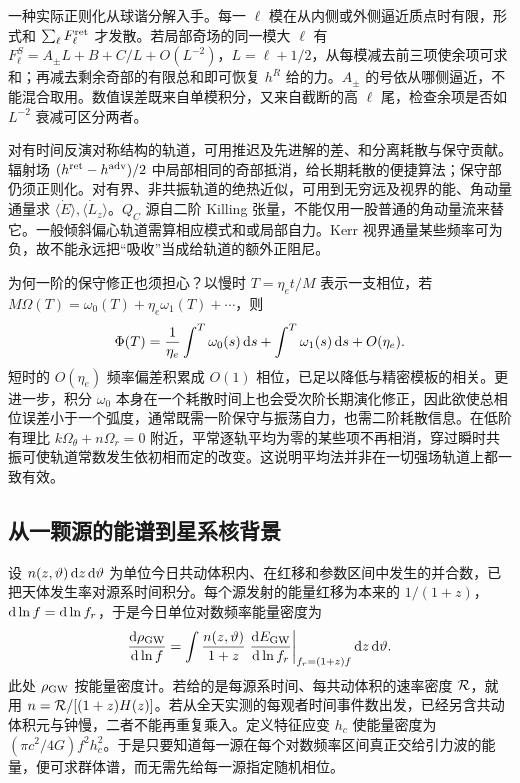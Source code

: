 一种实际正则化从球谐分解入手。每一 $\ell$ 模在从内侧或外侧逼近质点时有限，形式和 $\sum_\ell F_\ell^{\rm ret}$ 才发散。若局部奇场的同一模大 $\ell$ 有 $F_\ell^S=A_\pm L+B+C/L+O(L^{-2})$，$L=\ell+1/2$，从每模减去前三项使余项可求和；再减去剩余奇部的有限总和即可恢复 $h^R$ 给的力。$A_\pm$ 的号依从哪侧逼近，不能混合取用。数值误差既来自单模积分，又来自截断的高 $\ell$ 尾，检查余项是否如 $L^{-2}$ 衰减可区分两者。

对有时间反演对称结构的轨道，可用推迟及先进解的差、和分离耗散与保守贡献。辐射场 $(h^{\rm ret}-h^{\rm adv})/2$ 中局部相同的奇部抵消，给长期耗散的便捷算法；保守部仍须正则化。对有界、非共振轨道的绝热近似，可用到无穷远及视界的能、角动量通量求 $\langle\dot E\rangle,\langle\dot L_z\rangle$。$Q_C$ 源自二阶 Killing 张量，不能仅用一股普通的角动量流来替它。一般倾斜偏心轨道需算相应模式和或局部自力。Kerr 视界通量某些频率可为负，故不能永远把“吸收”当成给轨道的额外正阻尼。

为何一阶的保守修正也须担心？以慢时 $T=\eta_e t/M$ 表示一支相位，若 $M\Omega(T)=\omega_0(T)+\eta_e\omega_1(T)+\cdots$，则
\[
 \Phi(T)=\frac1{\eta_e}\int^T\omega_0(s)\,\dd s+
                         \int^T\omega_1(s)\,\dd s+O(\eta_e).
\]
短时的 $O(\eta_e)$ 频率偏差积累成 $O(1)$ 相位，已足以降低与精密模板的相关。更进一步，积分 $\omega_0$ 本身在一个耗散时间上也会受次阶长期演化修正，因此欲使总相位误差小于一个弧度，通常既需一阶保守与振荡自力，也需二阶耗散信息。在低阶有理比 $k\Omega_\theta+n\Omega_r=0$ 附近，平常逐轨平均为零的某些项不再相消，穿过瞬时共振可使轨道常数发生依初相而定的改变。这说明平均法并非在一切强场轨道上都一致有效。

\subsection{从一颗源的能谱到星系核背景}

设 $n(z,\vartheta)\,\dd z\,\dd\vartheta$ 为单位今日共动体积内、在红移和参数区间中发生的并合数，已把天体发生率对源系时间积分。每个源发射的能量红移为本来的 $1/(1+z)$，$\dd\ln f=\dd\ln f_r$，于是今日单位对数频率能量密度为
\begin{equation}
 \frac{\dd\rho_{\rm GW}}{\dd\ln f}
 =\int\frac{n(z,\vartheta)}{1+z}
     \left.\frac{\dd E_{\rm GW}}{\dd\ln f_r}\right|_{f_r=(1+z)f}
        \dd z\,\dd\vartheta .
 \label{eq:gw-cpopulation}
\end{equation}
此处 $\rho_{\rm GW}$ 按能量密度计。若给的是每源系时间、每共动体积的速率密度 ${\cal R}$，就用 $n={\cal R}/[(1+z)H(z)]$。若从全天实测的每观者时间事件数出发，已经另含共动体积元与钟慢，二者不能再重复乘入。定义特征应变 $h_c$ 使能量密度为 $(\pi c^2/4G)f^2 h_c^2$。于是只要知道每一源在每个对数频率区间真正交给引力波的能量，便可求群体谱，而无需先给每一源指定随机相位。

